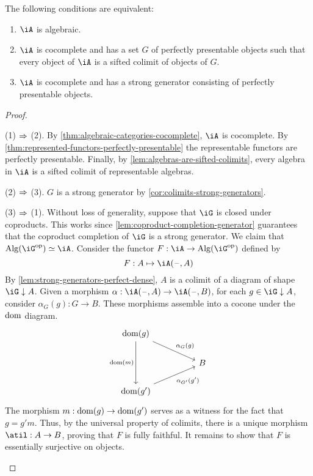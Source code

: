 \documentclass{zett}
\begin{document}
\begin{thm}
  The following conditions are equivalent:
  \begin{enumerate}
  \item $\iA$ is algebraic.
  \item $\iA$ is cocomplete and has a set $G$ of perfectly presentable objects such that every object of $\iA$ is a sifted colimit of objects of $G$.
  \item $\iA$ is cocomplete and has a strong generator consisting of perfectly presentable objects.
  \end{enumerate}
\end{thm}
\begin{proof}
  \begin{node}
    (1) $\Rightarrow$ (2).
    By \cref{thm:algebraic-categories-cocomplete}, $\iA$ is cocomplete.
    By \cref{thm:represented-functors-perfectly-presentable} the representable functors are perfectly presentable.
    Finally, by \cref{lem:algebras-are-sifted-colimits}, every algebra in $\iA$ is a sifted colimit of representable algebras.
  \end{node}
  \begin{node}
    (2) $\Rightarrow$ (3).
    $G$ is a strong generator by \cref{cor:colimits-strong-generators}.
  \end{node}
  \begin{node}
    (3) $\Rightarrow$ (1).
    Without loss of generality, suppose that $\iG$ is closed under coproducts.
    This works since \cref{lem:coproduct-completion-generator} guarantees that the coproduct completion of $\iG$ is a strong generator.
    We claim that $\Alg(\iG\op) \eqv \iA$.
    Consider the functor $F : \iA \to \Alg(\iG\op)$ defined by
    \[
      F : A \mapsto \iA(\blank, A)
    \]
    By \cref{lem:strong-generators-perfect-dense}, $A$ is a colimit of a diagram of shape $\iG \dn A$.
    Given a morphism $\alpha : \iA(\blank, A) \to \iA(\blank, B)$, for each $g \in \iG \dn A$, consider $\alpha_{G}(g) : G \to B$.
    These morphisms assemble into a cocone under the $\operatorname{dom}$ diagram.
    \[\begin{tikzcd}
	{\dom(g)} \\
	&& B \\
	{\dom(g')}
	\arrow["{\alpha_{G}(g)}", from=1-1, to=2-3]
	\arrow["{\alpha_{G'}(g')}"', from=3-1, to=2-3]
	\arrow["{\dom(m)}"', from=1-1, to=3-1]
      \end{tikzcd}\]
    The morphism $m : \operatorname{dom}(g) \to \operatorname{dom}(g')$ serves as a witness for the fact that $g = g'm$.
    Thus, by the universal property of colimits, there is a unique morphism $\atil : A \to B$, proving that $F$ is fully faithful.
    It remains to show that $F$ is essentially surjective on objects.
    \todo{}
  \end{node}
\end{proof}




\end{document}

